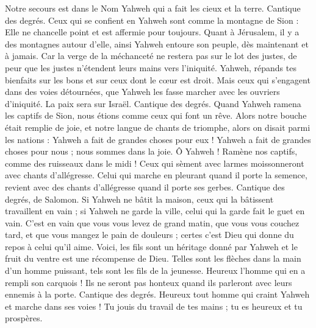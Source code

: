 \begin{multicols}{2}
Notre secours est dans le Nom Yahweh qui a fait les cieux et la terre.
\VerseOne{}Cantique des degrés. Ceux qui se confient en Yahweh sont comme la montagne de Sion : Elle ne chancelle point et est affermie pour toujours.
Quant à Jérusalem, il y a des montagnes autour d'elle, ainsi Yahweh entoure son peuple, dès maintenant et à jamais.
Car la verge de la méchanceté ne restera pas sur le lot des justes, de peur que les justes n’étendent leurs mains vers l'iniquité.
Yahweh, répands tes bienfaits sur les bons et sur ceux dont le cœur est droit.
Mais ceux qui s’engagent dans des voies détournées, que Yahweh les fasse marcher avec les ouvriers d'iniquité. La paix sera sur Israël.
\VerseOne{}Cantique des degrés. Quand Yahweh ramena les captifs de Sion, nous étions comme ceux qui font un rêve.
Alors notre bouche était remplie de joie, et notre langue de chants de triomphe, alors on disait parmi les nations : Yahweh a fait de grandes choses pour eux !
Yahweh a fait de grandes choses pour nous ; nous sommes dans la joie.
Ô Yahweh ! Ramène nos captifs, comme des ruisseaux dans le midi !
Ceux qui sèment avec larmes moissonneront avec chants d’allégresse.
Celui qui marche en pleurant quand il porte la semence, revient avec des chants d’allégresse quand il porte ses gerbes.
\VerseOne{}Cantique des degrés, de Salomon. Si Yahweh ne bâtit la maison, ceux qui la bâtissent travaillent en vain ; si Yahweh ne garde la ville, celui qui la garde fait le guet en vain.
C'est en vain que vous vous levez de grand matin, que vous vous couchez tard, et que vous mangez le pain de douleurs ; certes c'est Dieu qui donne du repos à celui qu'il aime.
Voici, les fils sont un héritage donné par Yahweh et le fruit du ventre est une récompense de Dieu.
Telles sont les flèches dans la main d'un homme puissant, tels sont les fils de la jeunesse.
Heureux l'homme qui en a rempli son carquois ! Ils ne seront pas honteux quand ils parleront avec leurs ennemis à la porte.
\VerseOne{}Cantique des degrés. Heureux tout homme qui craint Yahweh et marche dans ses voies !
Tu jouis du travail de tes mains ; tu es heureux et tu prospères.

\end{multicols}
